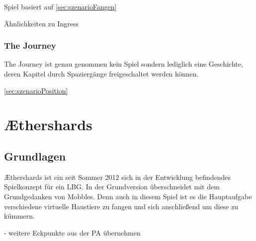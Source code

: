 Spiel basiert auf \ref{sec:szenarioFangen}

Ähnlichkeiten zu Ingress


\subsection{The Journey} 
The Journey ist genau genommen kein Spiel sondern lediglich eine Geschichte, deren Kapitel durch Spaziergänge freigeschaltet werden können. 

\ref{sec:szenarioPosition}

\chapter{Æthershards} 
\section{Grundlagen} 

Æthershards ist ein seit Sommer 2012 sich in der Entwicklung befindendes Spielkonzept für ein LBG. In der Grundversion überschneidet mit dem Grundgedanken von Mobbles. Denn auch in diesem Spiel ist es die Hauptaufgabe verschiedene virtuelle Haustiere zu fangen und sich anschließend um diese zu kümmern. 

- weitere Eckpunkte aus der PA übernehmen



